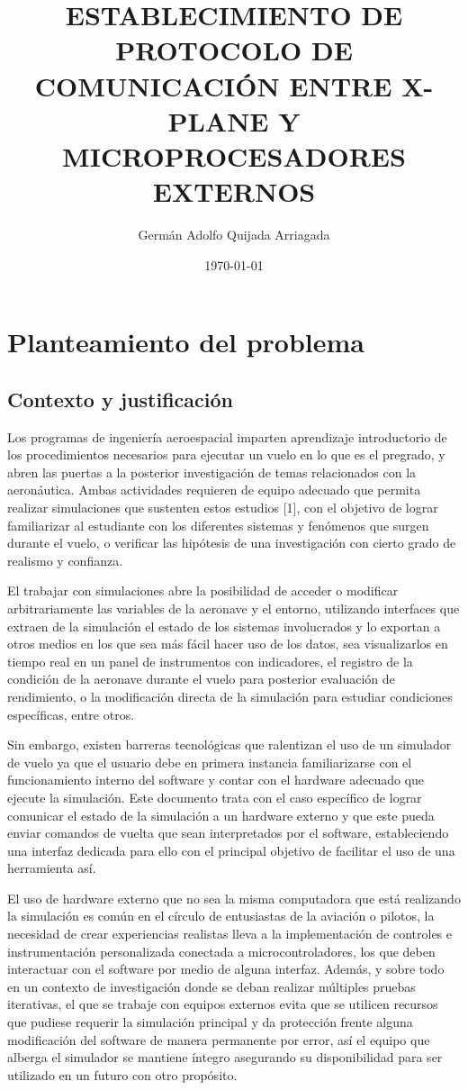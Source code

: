 \documentclass[12pt]{report}
\title{ESTABLECIMIENTO DE PROTOCOLO DE COMUNICACIÓN ENTRE
X-PLANE Y MICROPROCESADORES EXTERNOS}
\author{Germán Adolfo Quijada Arriagada}
\date{\today}
\begin{document}

\tableofcontents

\chapter{Planteamiento del problema}

\section{Contexto y justificación}

Los programas de ingeniería aeroespacial imparten aprendizaje introductorio de los procedimientos necesarios para ejecutar un vuelo en lo que es el pregrado, y abren las puertas a la posterior investigación de temas relacionados con la aeronáutica. Ambas actividades requieren de equipo adecuado que permita realizar simulaciones que sustenten estos estudios [1], con el objetivo de lograr familiarizar al estudiante con los diferentes sistemas y fenómenos que surgen durante el vuelo, o verificar las hipótesis de una investigación con cierto grado de realismo y confianza.

El trabajar con simulaciones abre la posibilidad de acceder o modificar arbitrariamente las variables de la aeronave y el entorno, utilizando interfaces que extraen de la simulación el estado de los sistemas involucrados y lo exportan a otros medios en los que sea más fácil hacer uso de los datos, sea visualizarlos en tiempo real en un panel de instrumentos con indicadores, el registro de la condición de la aeronave durante el vuelo para posterior evaluación de rendimiento, o la modificación directa de la simulación para estudiar condiciones específicas, entre otros.

Sin embargo, existen barreras tecnológicas que ralentizan el uso de un simulador de vuelo ya que el usuario debe en primera instancia familiarizarse con el funcionamiento interno del software y contar con el hardware adecuado que ejecute la simulación. Este documento trata con el caso específico de lograr comunicar el estado de la simulación a un hardware externo y que este pueda enviar comandos de vuelta que sean interpretados por el software, estableciendo una interfaz dedicada para ello con el principal objetivo de facilitar el uso de una herramienta así.

El uso de hardware externo que no sea la misma computadora que está realizando la simulación es común en el círculo de entusiastas de la aviación o pilotos, la necesidad de crear experiencias realistas lleva a la implementación de controles e instrumentación personalizada conectada a microcontroladores, los que deben interactuar con el software por medio de alguna interfaz. Además, y sobre todo en un contexto de investigación donde se deban realizar múltiples pruebas iterativas, el que se trabaje con equipos externos evita que se utilicen recursos que pudiese requerir la simulación principal y da protección frente alguna modificación del software de manera permanente por error, así el equipo que alberga el simulador se mantiene íntegro asegurando su disponibilidad para ser utilizado en un futuro con otro propósito.
\end{document}
